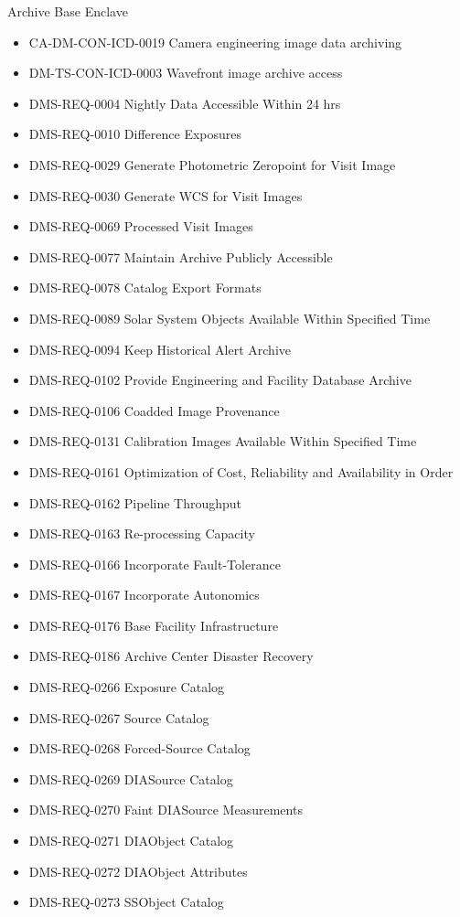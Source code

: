 Archive Base Enclave \begin{itemize}
\item CA-DM-CON-ICD-0019 Camera engineering image data archiving
\item DM-TS-CON-ICD-0003 Wavefront image archive access
\item DMS-REQ-0004 Nightly Data Accessible Within 24 hrs
\item DMS-REQ-0010 Difference Exposures
\item DMS-REQ-0029 Generate Photometric Zeropoint for Visit Image
\item DMS-REQ-0030 Generate WCS for Visit Images
\item DMS-REQ-0069 Processed Visit Images
\item DMS-REQ-0077 Maintain Archive Publicly Accessible
\item DMS-REQ-0078 Catalog Export Formats
\item DMS-REQ-0089 Solar System Objects Available Within Specified Time
\item DMS-REQ-0094 Keep Historical Alert Archive
\item DMS-REQ-0102 Provide Engineering and Facility Database Archive
\item DMS-REQ-0106 Coadded Image Provenance
\item DMS-REQ-0131 Calibration Images Available Within Specified Time
\item DMS-REQ-0161 Optimization of Cost, Reliability and Availability in Order
\item DMS-REQ-0162 Pipeline Throughput
\item DMS-REQ-0163 Re-processing Capacity
\item DMS-REQ-0166 Incorporate Fault-Tolerance
\item DMS-REQ-0167 Incorporate Autonomics
\item DMS-REQ-0176 Base Facility Infrastructure
\item DMS-REQ-0186 Archive Center Disaster Recovery
\item DMS-REQ-0266 Exposure Catalog
\item DMS-REQ-0267 Source Catalog
\item DMS-REQ-0268 Forced-Source Catalog
\item DMS-REQ-0269 DIASource Catalog
\item DMS-REQ-0270 Faint DIASource Measurements
\item DMS-REQ-0271 DIAObject Catalog
\item DMS-REQ-0272 DIAObject Attributes
\item DMS-REQ-0273 SSObject Catalog

\end{itemize}
